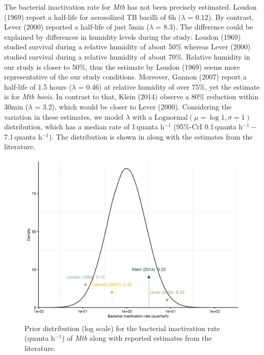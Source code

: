 \documentclass[fleqn,11pt]{wlscirep_supp}
\begin{document}
The bacterial inactivation rate for \emph{Mtb} has not been precisely estimated. Loudon (1969)\cite{Loudon1969AMRRD} report a half-life for aerosolized TB bacilli of 6h ($\lambda$ = 0.12). By contrast, Lever (2000)\cite{Lever2000LettersAppliedMicrobio} reported a half-life of just 5min ($\lambda$ = 8.3). The difference could be explained by differences in humidity levels during the study\cite{Lever2000LettersAppliedMicrobio}: Loudon (1969) studied survival during a relative humidity of about 50\% whereas Lever (2000) studied survival during a relative humidity of about 70\%. Relative humidity in our study is closer to 50\%, thus the estimate by Loudon (1969) seems more representative of the our study conditions.  Moreover, Gannon (2007)\cite{Gannon2007ResVetSci} report a half-life of 1.5 hours ($\lambda$ = 0.46) at relative humidity of over 75\%, yet the estimate is for \emph{Mtb bovis}. In contrast to that, Klein (2014)\cite{Klein2014IJMyco} observe a 80\% reduction within 30min ($\lambda$ = 3.2), which would be closer to Lever (2000). Considering the variation in these estimates, we model $\lambda$ with a $\mathrm{Lognormal}(\mu = \log 1, \sigma = 1)$ distribution, which has a median rate of 1\,quanta h$^{-1}$ (95\%-CrI 0.1\,quanta h$^{-1}$\,$-$\,7.1\,quanta h$^{-1}$). The distribution is shown in  along with the estimates from the literature.

\begin{figure}[!htpb]
    \centering
    \includegraphics{results/inputs/bacterial-inactivation-rate.png}
    \caption{Prior distribution (log scale) for the bacterial inactivation rate (quanta h$^{-1}$) of \emph{Mtb} along with reported estimates from the literature\cite{Loudon1969AMRRD,Gannon2007ResVetSci,Klein2014IJ,Lever2000LettersAppliedMicrobioMyco}.}
    \label{fig:lambda-distribution}
\end{figure}
\end{document}
